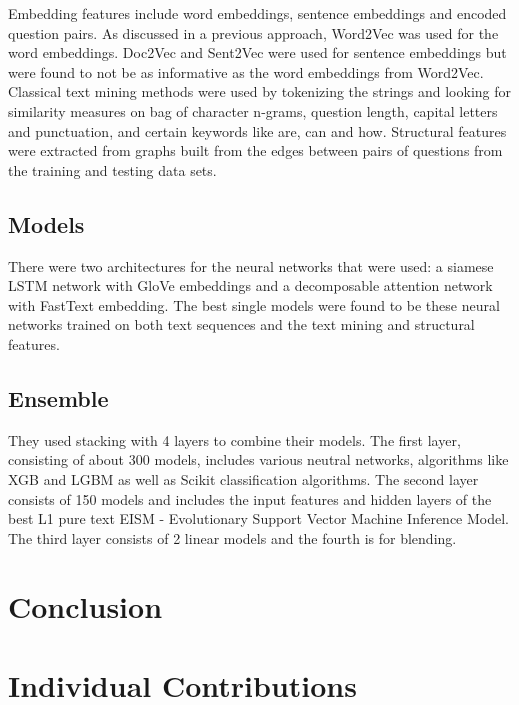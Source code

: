 \documentclass{article}
\begin{document}
Embedding features include word embeddings, sentence embeddings and encoded
question pairs. As discussed in a previous approach, Word2Vec was used for the
word embeddings. Doc2Vec and Sent2Vec were used for sentence embeddings but
were found to not be as informative as the word embeddings from Word2Vec. Classical text mining methods were used by tokenizing the strings and looking
for similarity measures on bag of character n-grams, question length, capital
letters and punctuation, and certain keywords like are, can and how. Structural
features were extracted from graphs built from the edges between pairs of
questions from the training and testing data sets.

\subsection{Models}

There were two architectures for the neural networks that were used: a siamese
LSTM network with GloVe embeddings and a decomposable attention network with
FastText embedding. The best single models were found to be these neural
networks trained on both text sequences and the text mining and structural
features.

\subsection{Ensemble}

They used stacking with 4 layers to combine their models. The first layer,
consisting of about 300 models, includes various neutral networks, algorithms
like XGB and LGBM as well as Scikit classification algorithms. The second layer
consists of 150 models and includes the input features and hidden layers of the
best L1 pure text EISM - Evolutionary Support Vector Machine Inference Model.
The third layer consists of 2 linear models and the fourth is for blending.

\section{Conclusion}

\appendix
\section*{Individual Contributions}
\end{document}
